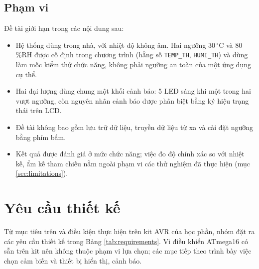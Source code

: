 \subsection{Phạm vi}

Đề tài giới hạn trong các nội dung sau:
\begin{itemize}[leftmargin=1.2cm]
    \item Hệ thống dùng trong nhà, với nhiệt độ không âm. Hai ngưỡng 30\,$^\circ$C và 80\,\%RH được cố định trong chương trình (hằng số \texttt{TEMP\_TH}, \texttt{HUMI\_TH}) và dùng làm mốc kiểm thử chức năng, không phải ngưỡng an toàn của một ứng dụng cụ thể.
    \item Hai đại lượng dùng chung một khối cảnh báo: 5 LED sáng khi một trong hai vượt ngưỡng, còn nguyên nhân cảnh báo được phân biệt bằng ký hiệu trạng thái trên LCD.
    \item Đề tài không bao gồm lưu trữ dữ liệu, truyền dữ liệu từ xa và cài đặt ngưỡng bằng phím bấm.
    \item Kết quả được đánh giá ở mức chức năng; việc đo độ chính xác so với nhiệt kế, ẩm kế tham chiếu nằm ngoài phạm vi các thử nghiệm đã thực hiện (mục \ref{sec:limitations}).
\end{itemize}

\section{Yêu cầu thiết kế}
\label{sec:requirements}

Từ mục tiêu trên và điều kiện thực hiện trên kit AVR của học phần, nhóm đặt ra các yêu cầu thiết kế trong Bảng \ref{tab:requirements}. Vi điều khiển ATmega16 có sẵn trên kit nên không thuộc phạm vi lựa chọn; các mục tiếp theo trình bày việc chọn cảm biến và thiết bị hiển thị, cảnh báo.

